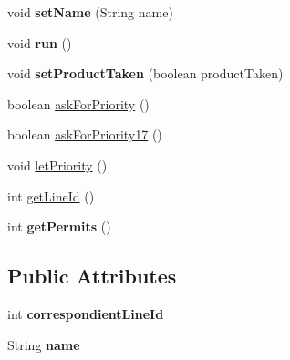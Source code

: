 \begin{DoxyCompactItemize}
\item 
\mbox{\label{classmondragon_1_1edu_1_1clases_1_1_workstation_a594abd6fe41ebe20883c675a46f991ca}} 
void {\bfseries set\+Name} (String name)
\item 
\mbox{\label{classmondragon_1_1edu_1_1clases_1_1_workstation_a93c1df24407aa7f5ad4070ec2d9f7aba}} 
void {\bfseries run} ()
\item 
\mbox{\label{classmondragon_1_1edu_1_1clases_1_1_workstation_a2ee964fc8312873d43c406d0d3c7e096}} 
void {\bfseries set\+Product\+Taken} (boolean product\+Taken)
\item 
boolean \mbox{\hyperlink{classmondragon_1_1edu_1_1clases_1_1_workstation_abfbdb841a42bd7b3bcd3f09e805fed39}{ask\+For\+Priority}} ()
\item 
boolean \mbox{\hyperlink{classmondragon_1_1edu_1_1clases_1_1_workstation_a49feeeb5cefa0f0e49792170d8821c51}{ask\+For\+Priority17}} ()
\item 
void \mbox{\hyperlink{classmondragon_1_1edu_1_1clases_1_1_workstation_a4f30271abefe9895917bc2550224bae0}{let\+Priority}} ()
\item 
int \mbox{\hyperlink{classmondragon_1_1edu_1_1clases_1_1_workstation_af52377c8c57aa8eb17b9aa8e032ce77c}{get\+Line\+Id}} ()
\item 
\mbox{\label{classmondragon_1_1edu_1_1clases_1_1_workstation_a79212c0914b9b32e0914fde76e7a78a0}} 
int {\bfseries get\+Permits} ()
\end{DoxyCompactItemize}
\subsection*{Public Attributes}
\begin{DoxyCompactItemize}
\item 
\mbox{\label{classmondragon_1_1edu_1_1clases_1_1_workstation_a48031e566b5feb48bfef02312b3204f5}} 
int {\bfseries correspondient\+Line\+Id}
\item 
\mbox{\label{classmondragon_1_1edu_1_1clases_1_1_workstation_a20e6d7a8c7eff24a91d7312d9014cda8}} 
String {\bfseries name}
\end{DoxyCompactItemize}


